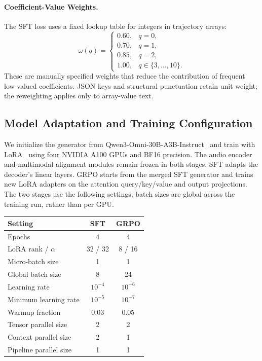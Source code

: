 \paragraph{Coefficient-Value Weights.}
The SFT loss uses a fixed lookup table for integers in trajectory arrays:
\begin{equation}
\omega(q)=
\begin{cases}
0.60,&q=0,\\
0.70,&q=1,\\
0.85,&q=2,\\
1.00,&q\in\{3,\ldots,10\}.
\end{cases}
\end{equation}
These are manually specified weights that reduce the contribution of frequent low-valued coefficients. JSON keys and structural punctuation retain unit weight; the reweighting applies only to array-value text.

\subsection{Model Adaptation and Training Configuration}
\label{app:training}

We initialize the generator from Qwen3-Omni-30B-A3B-Instruct~\cite{xu2025qwen3omni} and train with LoRA~\cite{hu2021lora} using four NVIDIA A100 GPUs and BF16 precision.
The audio encoder and multimodal alignment modules remain frozen in both stages.
SFT adapts the decoder's linear layers. GRPO starts from the merged SFT generator and trains new LoRA adapters on the attention query/key/value and output projections.
The two stages use the following settings; batch sizes are global across the training run, rather than per GPU.

\begin{center}
\small
\begin{tabular}{lcc}
\hline
Setting & SFT & GRPO \\
\hline
Epochs & 4 & 4 \\
LoRA rank / $\alpha$ & 32 / 32 & 8 / 16 \\
Micro-batch size & 1 & 1 \\
Global batch size & 8 & 24 \\
Learning rate & $10^{-4}$ & $10^{-6}$ \\
Minimum learning rate & $10^{-5}$ & $10^{-7}$ \\
Warmup fraction & 0.03 & 0.05 \\
Tensor parallel size & 2 & 2 \\
Context parallel size & 2 & 1 \\
Pipeline parallel size & 1 & 1 \\
\hline
\end{tabular}
\end{center}

